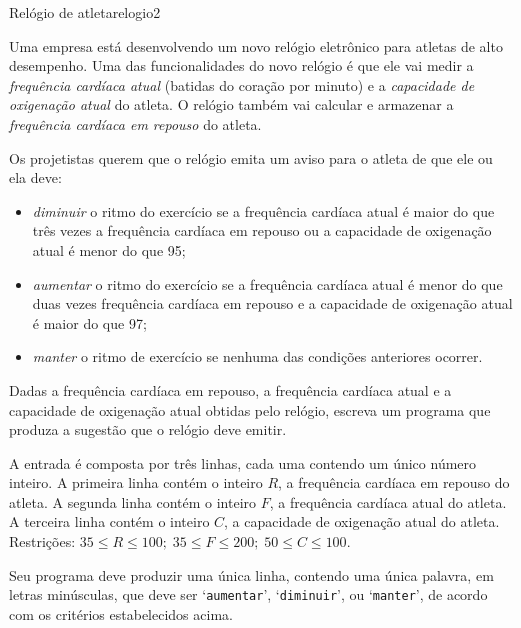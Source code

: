 \documentclass[12pt,a4paper,oneside]{article}
\begin{document}
\begin{problem}{Relógio de atleta}{relogio}{2}

Uma empresa está desenvolvendo um novo relógio eletrônico para atletas de alto desempenho. Uma das funcionalidades do novo relógio é que ele vai medir a \textit{frequência cardíaca atual} (batidas do coração por minuto) e a \textit{capacidade de oxigenação atual} do atleta. O relógio também vai calcular e armazenar a \textit{frequência cardíaca em repouso} do atleta.

Os projetistas querem que o relógio emita um aviso para o atleta de que ele ou ela deve:\\[-18pt]

\begin{itemize}
\item \textit{diminuir} o ritmo do exercício se a frequência cardíaca atual é maior do que três vezes a frequência cardíaca em repouso ou a capacidade de oxigenação atual é menor do que 95;\\[-18pt]
\item \textit{aumentar} o ritmo do exercício se a frequência cardíaca atual é menor do que duas vezes frequência cardíaca em repouso e a capacidade de oxigenação atual é maior do que 97;\\[-18pt]
\item \textit{manter} o ritmo de exercício se nenhuma das condições anteriores ocorrer.\\[-18pt]
\end{itemize}

Dadas a frequência cardíaca em repouso, a frequência cardíaca atual e a capacidade de oxigenação atual obtidas pelo relógio, escreva um programa que produza a sugestão que o relógio deve emitir.

%

\InputFile

A entrada é composta por três linhas, cada uma contendo um único número inteiro. A primeira linha contém o inteiro $R$, a frequência cardíaca em repouso do atleta. A segunda linha contém o inteiro $F$, a frequência cardíaca atual do atleta. A terceira linha contém o inteiro $C$, a capacidade de oxigenação atual do atleta. Restrições:  $35 \leq R \leq 100;\; 35 \leq F \leq 200;\; 50 \leq C \leq 100$.


\OutputFile

Seu programa deve produzir uma única linha, contendo uma única palavra, em letras minúsculas, que deve ser `\texttt{aumentar}', `\texttt{diminuir}', ou `\texttt{manter}', de acordo com os critérios estabelecidos acima.


\end{problem}
\end{document}
